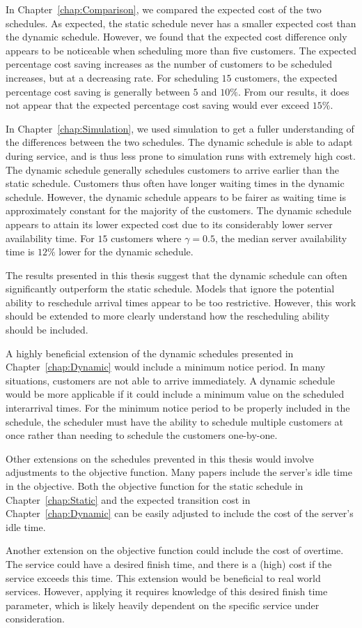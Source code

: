 In Chapter~\ref{chap:Comparison}, we compared the expected cost of the two schedules. As expected, the static schedule never has a smaller expected cost than the dynamic schedule. However, we found that the expected cost difference only appears to be noticeable when scheduling more than five customers. The expected percentage cost saving increases as the number of customers to be scheduled increases, but at a decreasing rate. For scheduling $15$ customers, the expected percentage cost saving is generally between $5$ and $10\%$. From our results, it does not appear that the expected percentage cost saving would ever exceed $15\%$.

In Chapter~\ref{chap:Simulation}, we used simulation to get a fuller understanding of the differences between the two schedules. The dynamic schedule is able to adapt during service, and is thus less prone to simulation runs with extremely high cost. The dynamic schedule generally schedules customers to arrive earlier than the static schedule. Customers thus often have longer waiting times in the dynamic schedule. However, the dynamic schedule appears to be fairer as waiting time is approximately constant for the majority of the customers. The dynamic schedule appears to attain its lower expected cost due to its considerably lower server availability time. For $15$ customers where $\gamma = 0.5$, the median server availability time is $12 \%$ lower for the dynamic schedule.

The results presented in this thesis suggest that the dynamic schedule can often significantly outperform the static schedule. Models that ignore the potential ability to reschedule arrival times appear to be too restrictive. However, this work should be extended to more clearly understand how the rescheduling ability should be included.

A highly beneficial extension of the dynamic schedules presented in Chapter~\ref{chap:Dynamic} would include a minimum notice period. In many situations, customers are not able to arrive immediately. A dynamic schedule would be more applicable if it could include a minimum value on the scheduled interarrival times. For the minimum notice period to be properly included in the schedule, the scheduler must have the ability to schedule multiple customers at once rather than needing to schedule the customers one-by-one.

Other extensions on the schedules prevented in this thesis would involve adjustments to the objective function. Many papers include the server's idle time in the objective. Both the objective function for the static schedule in Chapter~\ref{chap:Static} and the expected transition cost in Chapter~\ref{chap:Dynamic} can be easily adjusted to include the cost of the server's idle time.

Another extension on the objective function could include the cost of overtime. The service could have a desired finish time, and there is a (high) cost if the service exceeds this time. This extension would be beneficial to real world services. However, applying it requires knowledge of this desired finish time parameter, which is likely heavily dependent on the specific service under consideration.